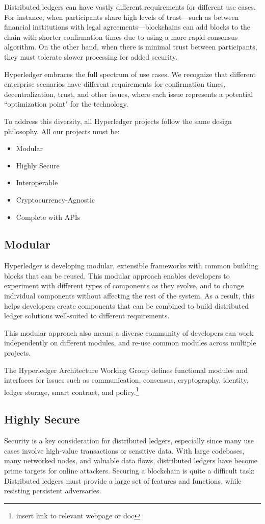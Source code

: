 Distributed ledgers can have vastly different requirements for different use cases. 
For instance, when participants share high levels of trust---such as between financial institutions with legal agreements---blockchains can add blocks to the chain with shorter confirmation times due to using a more rapid consensus algorithm. 
On the other hand, when there is minimal trust between participants, they must tolerate slower processing for added security.

Hyperledger embraces the full spectrum of use cases. We recognize that different enterprise scenarios have different requirements for confirmation times, decentralization, trust, and other issues, where each issue represents a potential ``optimization point" for the technology. 

To address this diversity, all Hyperledger projects follow the same design philosophy. All our projects must be:  
\begin{itemize}
\item Modular  
\item Highly Secure 
\item Interoperable
\item Cryptocurrency-Agnostic 
\item Complete with APIs
\end{itemize}

\subsection{Modular} 
Hyperledger is developing modular, extensible frameworks with common building blocks that can  be reused.
This modular approach enables developers to experiment with different types of components as they evolve, and to change individual components without affecting the rest of the system. 
As a result, this helps developers create components that can be combined to build distributed ledger solutions well-suited to different requirements. 

This modular approach also means a diverse community of developers can work independently on different modules, and re-use common modules across multiple projects. 

The Hyperledger Architecture Working Group defines functional modules and interfaces for issues such as communication, consensus, cryptography, identity, ledger storage, smart contract, and policy.\footnote{insert link to relevant webpage or doc} 

\subsection{Highly Secure}
Security is a key consideration for distributed ledgers, especially since many use cases involve high-value transactions or sensitive data.
With large codebases, many networked nodes, and valuable data flows, distributed ledgers have become prime targets for online attackers. 
Securing a blockchain is quite a difficult task: Distributed ledgers must provide a large set of features and functions, while resisting persistent adversaries. 

